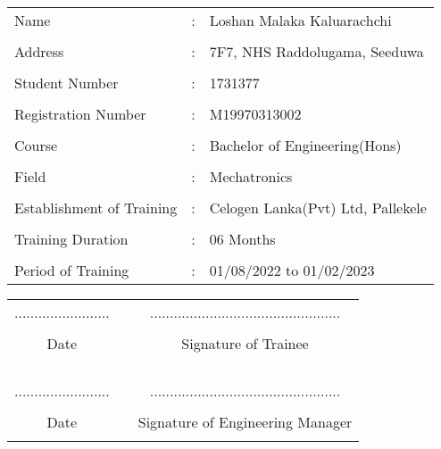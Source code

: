 \documentclass[a4paper,12pt]{article}
\begin{document}
	   			\begin{flushleft}
					\begin{tabular}{lll}
						Name 				& : & Loshan Malaka Kaluarachchi \\
											& 	& \\
						Address				& : & 7F7, NHS Raddolugama, Seeduwa\\
						& 	& \\
						Student Number 		& : & 1731377 \\
						&	& \\
						Registration Number	& :	& M19970313002\\
						& 	& \\
						Course 				& : & Bachelor of Engineering(Hons) \\
						& 	& \\
						Field 				& : & Mechatronics \\
						&	& \\
						Establishment of Training & : & Celogen Lanka(Pvt) Ltd, Pallekele\\
						&	& \\
						Training Duration	& : & 06 Months\\
						&	& \\
						Period of Training				& : & 01/08/2022 to 01/02/2023\\
					\end{tabular}
				\end{flushleft}
			\vspace{4cm}
				\begin{center}
					\begin{tabular}{c p{5cm} c}
						 ........................ &  & ................................................ \\
						 &  & \\
						 Date &  & Signature of Trainee \\
						 &  & \\
						 &  & \\
						 &  & \\
						 &  & \\
						  ........................ &  & ................................................ \\
						 &  & \\
						 Date &  & Signature of Engineering Manager \\
						 &  & \\
					\end{tabular}
				\end{center}
	\newpage
\end{document}
